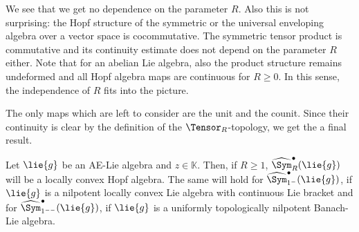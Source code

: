 \begin{remark}
	We see that we get no dependence on the parameter $R$. Also this is not 
	surprising: the Hopf structure of the symmetric or the universal enveloping 
	algebra over a vector space is cocommutative. The symmetric tensor product is 
	commutative and its continuity estimate does not depend on the parameter $R$ 
	either. Note that for an abelian Lie algebra, also the product structure  
	remains undeformed and all Hopf algebra maps are continuous for $R \geq 0$. In 
	this sense, the independence of $R$ fits into the picture.
\end{remark}


The only maps which are left to consider are the unit and the counit. Since their 
continuity is clear by the definition of the $\Tensor_R$-topology, we get the 
a final result.
\begin{theorem}
    \label{Prop:Hopf:ContinuousHopf}%
    Let $\lie{g}$ be an AE-Lie algebra and $z \in \mathbb{K}$. Then, 
    if $R \geq 1$, $\widehat{\Sym}_R^\bullet (\lie{g})$ will be a locally convex 
    Hopf algebra. The same will hold for $\widehat{\Sym}_{1^-}^{\bullet}
    (\lie{g})$, if $\lie{g}$ is a nilpotent locally convex Lie algebra with 
    continuous Lie bracket and for $\widehat{\Sym}_{1^{--}}^{\bullet}(\lie{g})$, 
    if $\lie{g}$ is a uniformly topologically nilpotent Banach-Lie algebra.
\end{theorem}
